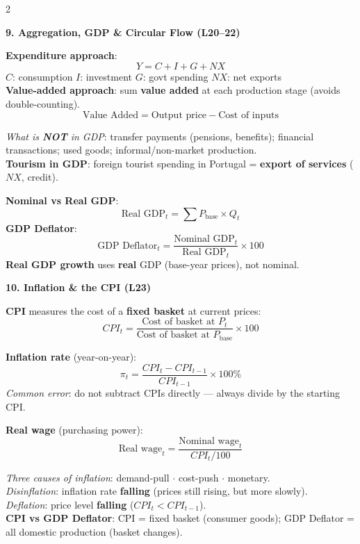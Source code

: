 \documentclass[9pt]{article}
\begin{document}
\begin{multicols}{2}

\begin{greenbox}
\textbf{\color{macro_green}9. Aggregation, GDP \& Circular Flow (L20--22)}

\smallskip
\textbf{Expenditure approach}:
\[
  Y = C + I + G + NX
\]
$C$: consumption \quad $I$: investment \quad $G$: govt spending \quad $NX$: net exports\\[3pt]

\textbf{Value-added approach}: sum \textbf{value added} at each production stage (avoids double-counting).
\[
  \text{Value Added} = \text{Output price} - \text{Cost of inputs}
\]

\textit{What is \textbf{NOT} in GDP}: transfer payments (pensions, benefits); financial transactions; used goods; informal/non-market production.\\[3pt]

\textbf{Tourism in GDP}: foreign tourist spending in Portugal = \textbf{export of services} ($NX$, credit).

\smallskip
\textbf{Nominal vs Real GDP}:
\[
  \text{Real GDP}_t = \sum P_{\text{base}} \times Q_t
\]
\textbf{GDP Deflator}:
\[
  \text{GDP Deflator}_t = \frac{\text{Nominal GDP}_t}{\text{Real GDP}_t} \times 100
\]
\textbf{Real GDP growth} uses \textbf{real} GDP (base-year prices), not nominal.
\end{greenbox}

\begin{greenbox}
\textbf{\color{macro_green}10. Inflation \& the CPI (L23)}

\smallskip
\textbf{CPI} measures the cost of a \textbf{fixed basket} at current prices:
\[
  CPI_t = \frac{\text{Cost of basket at }P_t}{\text{Cost of basket at }P_{\text{base}}} \times 100
\]

\textbf{Inflation rate} (year-on-year):
\[
  \pi_t = \frac{CPI_t - CPI_{t-1}}{CPI_{t-1}} \times 100\%
\]
\textit{Common error}: do not subtract CPIs directly --- always divide by the starting CPI.

\smallskip
\textbf{Real wage} (purchasing power):
\[
  \text{Real wage}_t = \frac{\text{Nominal wage}_t}{CPI_t / 100}
\]

\textit{Three causes of inflation}: demand-pull $\cdot$ cost-push $\cdot$ monetary.\\[2pt]
\textit{Disinflation}: inflation rate \textbf{falling} (prices still rising, but more slowly).\\
\textit{Deflation}: price level \textbf{falling} ($CPI_t < CPI_{t-1}$).\\[2pt]
\textbf{CPI vs GDP Deflator}: CPI = fixed basket (consumer goods); GDP Deflator = all domestic production (basket changes).
\end{greenbox}


\end{multicols}
\end{document}
